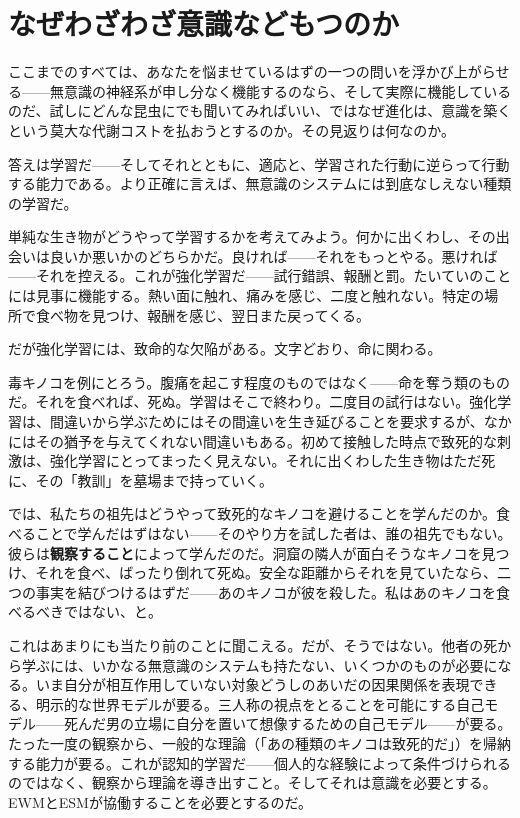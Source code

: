 \documentclass[11pt, twoside, openright]{book}
\begin{document}
\section*{なぜわざわざ意識などもつのか}

ここまでのすべては、あなたを悩ませているはずの一つの問いを浮かび上がらせる------無意識の神経系が申し分なく機能するのなら、そして実際に機能しているのだ、試しにどんな昆虫にでも聞いてみればいい、ではなぜ進化は、意識を築くという莫大な代謝コストを払おうとするのか。その見返りは何なのか。

答えは学習だ------そしてそれとともに、適応と、学習された行動に逆らって行動する能力である。より正確に言えば、無意識のシステムには到底なしえない種類の学習だ。

単純な生き物がどうやって学習するかを考えてみよう。何かに出くわし、その出会いは良いか悪いかのどちらかだ。良ければ------それをもっとやる。悪ければ------それを控える。これが強化学習だ------試行錯誤、報酬と罰。たいていのことには見事に機能する。熱い面に触れ、痛みを感じ、二度と触れない。特定の場所で食べ物を見つけ、報酬を感じ、翌日また戻ってくる。

だが強化学習には、致命的な欠陥がある。文字どおり、命に関わる。

毒キノコを例にとろう。腹痛を起こす程度のものではなく------命を奪う類のものだ。それを食べれば、死ぬ。学習はそこで終わり。二度目の試行はない。強化学習は、間違いから学ぶためにはその間違いを生き延びることを要求するが、なかにはその猶予を与えてくれない間違いもある。初めて接触した時点で致死的な刺激は、強化学習にとってまったく見えない。それに出くわした生き物はただ死に、その「教訓」を墓場まで持っていく。

では、私たちの祖先はどうやって致死的なキノコを避けることを学んだのか。食べることで学んだはずはない------そのやり方を試した者は、誰の祖先でもない。彼らは\textbf{観察すること}によって学んだのだ。洞窟の隣人が面白そうなキノコを見つけ、それを食べ、ばったり倒れて死ぬ。安全な距離からそれを見ていたなら、二つの事実を結びつけるはずだ------あのキノコが彼を殺した。私はあのキノコを食べるべきではない、と。

これはあまりにも当たり前のことに聞こえる。だが、そうではない。他者の死から学ぶには、いかなる無意識のシステムも持たない、いくつかのものが必要になる。いま自分が相互作用していない対象どうしのあいだの因果関係を表現できる、明示的な世界モデルが要る。三人称の視点をとることを可能にする自己モデル------死んだ男の立場に自分を置いて想像するための自己モデル------が要る。たった一度の観察から、一般的な理論（「あの種類のキノコは致死的だ」）を帰納する能力が要る。これが認知的学習だ------個人的な経験によって条件づけられるのではなく、観察から理論を導き出すこと。そしてそれは意識を必要とする。EWMとESMが協働することを必要とするのだ。
\end{document}
